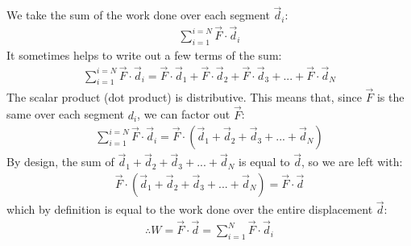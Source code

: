 \begin{solution}
We take the sum of the work done over each segment $\vec d_i$: 
\begin{align*}
\sum_{i=1}^{i=N} \vec F \cdot \vec d_i
\end{align*}
It sometimes helps to write out a few terms of the sum:
\begin{align*}
\sum_{i=1}^{i=N}\vec F \cdot \vec d_i
=\vec F \cdot \vec d_1+\vec F \cdot \vec d_2+\vec F \cdot \vec d_3+...+\vec F \cdot \vec d_N
\end{align*}
The scalar product (dot product) is distributive. This means that, since $\vec F$ is the same over each segment $d_i$, we can factor out $\vec F$:
\begin{align*}
\sum_{i=1}^{i=N}\vec F \cdot \vec d_i = \vec F \cdot (\vec d_1 + \vec d_2 + \vec d_3 +...+ \vec d_N)
\end{align*}
By design, the sum of $\vec d_1 + \vec d_2 + \vec d_3 +...+ \vec d_N$ is equal to $\vec d$, so we are left with:
\begin{align*}
\vec F \cdot (\vec d_1 + \vec d_2 + \vec d_3 +...+ \vec d_N) = \vec F \cdot \vec d
\end{align*}
which by definition is equal to the work done over the entire displacement $\vec d$:
\begin{align*}
\therefore W=\vec F \cdot \vec d=\sum_{i=1}^{N}\vec F \cdot \vec d_i
\end{align*}
\end{solution}

